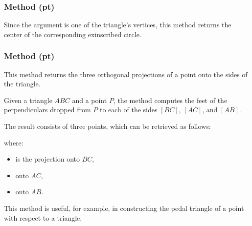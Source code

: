 \subsubsection{Method (pt)} %
\label{ssub:method_triangle_excenter_pt}
Since the argument is one of the triangle's vertices, this method returns the center of the corresponding exinscribed circle.


\subsubsection{Method (pt)} %
\label{ssub:method_triangle_projection_pt}

This method returns the three orthogonal projections of a point onto the sides of the triangle.

\medskip
\noindent
Given a triangle $ABC$ and a point $P$, the method computes the feet of the perpendiculars dropped from $P$ to each of the sides $[BC]$, $[AC]$, and $[AB]$.

\medskip
\noindent
The result consists of three points, which can be retrieved as follows:
\begin{mybox}
\end{mybox}
where:
\begin{itemize}
  \item {} is the projection onto $BC$,
  \item {} onto $AC$,
  \item {} onto $AB$.
\end{itemize}

\medskip
\noindent
This method is useful, for example, in constructing the pedal triangle of a point with respect to a triangle.

\vspace{1em}


\begin{tkzexample}[latex = 7cm]
  \begin{center}
    \end{center}
\end{tkzexample}

